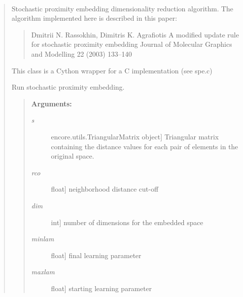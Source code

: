 \documentclass[letterpaper,10pt,english]{sphinxmanual}
\begin{document}
\begin{fulllineitems}
\label{index:encore.dimensionality_reduction.stochasticproxembed.StochasticProximityEmbedding}~\begin{quote}

Stochastic proximity embedding dimensionality reduction algorithm. The algorithm implemented here is described in this paper:
\begin{quote}

Dmitrii N. Rassokhin, Dimitris K. Agrafiotis
A modified update rule for stochastic proximity embedding
Journal of Molecular Graphics and Modelling 22 (2003) 133–140
\end{quote}

This class is a Cython wrapper for a C implementation (see spe.c)

\begin{fulllineitems}
\label{index:encore.dimensionality_reduction.stochasticproxembed.StochasticProximityEmbedding.run}
\end{fulllineitems}


Run stochastic proximity embedding.
\begin{quote}

\textbf{Arguments:}
\begin{description}
\item[{\emph{s}}] \leavevmode{[}encore.utils.TriangularMatrix object{]}
Triangular matrix containing the distance values for each pair of elements in the original space.

\item[{\emph{rco}}] \leavevmode{[}float{]}
neighborhood distance cut-off

\item[{\emph{dim}}] \leavevmode{[}int{]}
number of dimensions for the embedded space

\item[{\emph{minlam}}] \leavevmode{[}float{]}
final learning parameter

\item[{\emph{maxlam}}] \leavevmode{[}float{]}
starting learning parameter


\end{description}
\end{quote}
\end{quote}
\end{fulllineitems}
\end{document}
